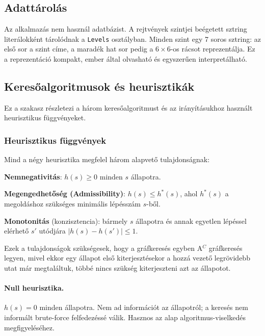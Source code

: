 \subsection{Adattárolás}

Az alkalmazás nem használ adatbázist. A rejtvények szintjei beégetett sztring literálokként tárolódnak a \texttt{Levels} osztályban. Minden szint egy 7 soros sztring: az első sor a szint címe, a maradék hat sor pedig a $6\times6$-os rácsot reprezentálja. Ez a reprezentáció kompakt, ember által olvasható és egyszerűen interpretálható.

\subsection{Keresőalgoritmusok és heurisztikák}
\label{sec:algorithms}

Ez a szakasz részletezi a három keresőalgoritmust és az irányításukhoz használt heurisztikus függvényeket.

\subsubsection{Heurisztikus függvények}

Mind a négy heurisztika megfelel három alapvető tulajdonságnak:
\begin{compactitem}
\item \textbf{Nemnegativitás}: $h(s) \geq 0$ minden $s$ állapotra.
\item \textbf{Megengedhetőség (Admissibility)}: $h(s) \leq h^*(s)$, ahol $h^*(s)$ a megoldáshoz szükséges minimális lépésszám $s$-ből.
\item \textbf{Monotonitás} (konzisztencia): bármely $s$ állapotra és annak egyetlen lépéssel elérhető $s'$ utódjára $| h(s) - h(s') | \leq 1$.
\end{compactitem}

Ezek a tulajdonságok szükségesek, hogy a gráfkeresés egyben A$^C$ gráfkeresés legyen, mivel ekkor egy állapot első kiterjesztésekor a hozzá vezető legrövidebb utat már megtaláltuk, többé nincs szükség kiterjeszteni azt az állapotot.~\cite[69.~oldal, 4.3-as tétel]{gregorics_2006_bevezetes} \cite[16.~oldal]{gregorics_grafker}

\paragraph{Null heurisztika.} $h(s) = 0$ minden állapotra. Nem ad információt az állapotról; a keresés nem informált brute-force felfedezéssé válik. Hasznos az alap algoritmus-viselkedés megfigyeléséhez.

